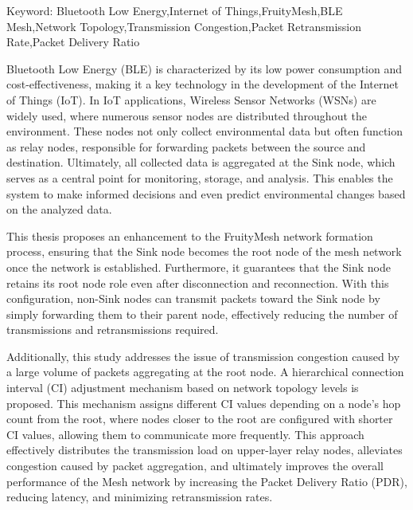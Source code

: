 \begin{EnAbstract}
    \begin{EnAbstractItems}
        \noindent \text Keyword: Bluetooth Low Energy,Internet of Things,FruityMesh,BLE Mesh,Network Topology,Transmission Congestion,Packet Retransmission Rate,Packet Delivery Ratio
    \end{EnAbstractItems}

    \begin{EnAbstractDescription}
        Bluetooth Low Energy (BLE) is characterized by its low power consumption and cost-effectiveness, making it a key technology in the development of the Internet of Things (IoT). In IoT applications, Wireless Sensor Networks (WSNs) are widely used, where numerous sensor nodes are distributed throughout the environment. These nodes not only collect environmental data but often function as relay nodes, responsible for forwarding packets between the source and destination. Ultimately, all collected data is aggregated at the Sink node, which serves as a central point for monitoring, storage, and analysis. This enables the system to make informed decisions and even predict environmental changes based on the analyzed data.

        This thesis proposes an enhancement to the FruityMesh network formation process, ensuring that the Sink node becomes the root node of the mesh network once the network is established. Furthermore, it guarantees that the Sink node retains its root node role even after disconnection and reconnection. With this configuration, non-Sink nodes can transmit packets toward the Sink node by simply forwarding them to their parent node, effectively reducing the number of transmissions and retransmissions required. 

        Additionally, this study addresses the issue of transmission congestion caused by a large volume of packets aggregating at the root node. A hierarchical connection interval (CI) adjustment mechanism based on network topology levels is proposed. This mechanism assigns different CI values depending on a node's hop count from the root, where nodes closer to the root are configured with shorter CI values, allowing them to communicate more frequently. This approach effectively distributes the transmission load on upper-layer relay nodes, alleviates congestion caused by packet aggregation, and ultimately improves the overall performance of the Mesh network by increasing the Packet Delivery Ratio (PDR), reducing latency, and minimizing retransmission rates.
    \end{EnAbstractDescription}
    
\end{EnAbstract}

